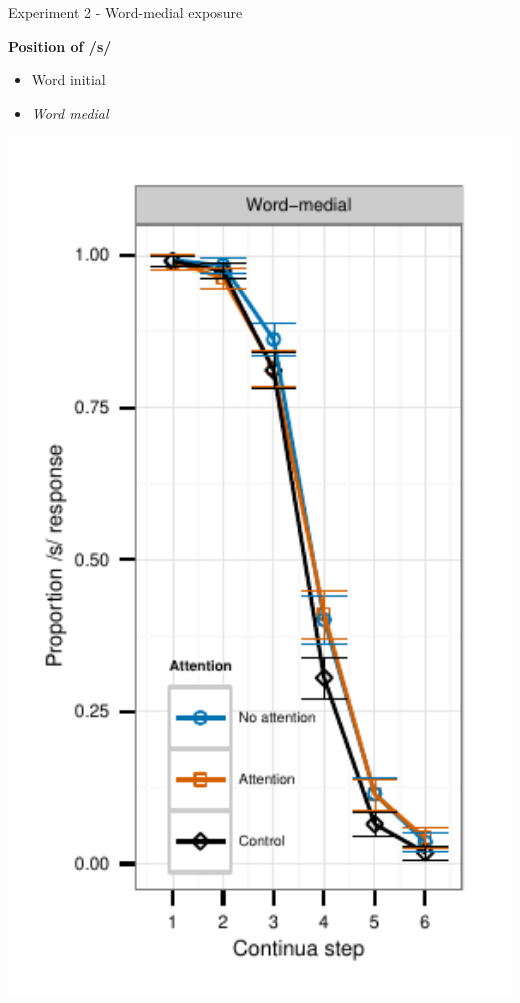 \documentclass{beamer}
\begin{document}
\begin{frame}{Experiment 2 - Word-medial exposure}
\begin{minipage}{0.45\textwidth}
\textbf{Position of /s/}
\begin{itemize}
\item Word initial
\item \emph{Word medial}
\end{itemize}
\end{minipage}
\hfill
\begin{minipage}{0.4\textwidth}
\includegraphics[width=1.0\textwidth]{graphs/exp2_categresults_present2-final}
\end{minipage}

\end{frame}
\end{document}
